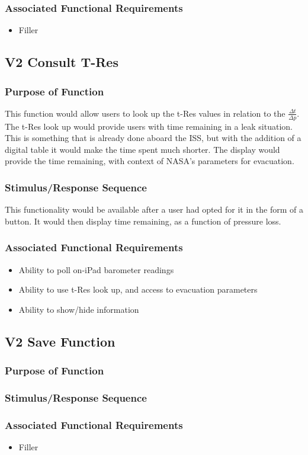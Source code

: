 \documentclass[onecolumn, draftclsnofoot,10pt, compsoc]{IEEEtran}
\begin{document}
\subsubsection{Associated Functional Requirements}
\begin{itemize}
\item Filler
\end{itemize}

\subsection{V2 Consult T-Res}
\subsubsection{Purpose of Function}
This function would allow users to look up the t-Res values in relation to the $\frac{\Delta t}{\Delta p}$.
The t-Res look up would provide users with time remaining in a leak situation.
This is something that is already done aboard the ISS, but with the addition of a digital table it would make the time spent much shorter.
The display would provide the time remaining, with context of NASA's parameters for evacuation.
\subsubsection{Stimulus/Response Sequence}
This functionality would be available after a user had opted for it in the form of a button.
It would then display time remaining, as a function of pressure loss.
\subsubsection{Associated Functional Requirements}
\begin{itemize}
\item Ability to poll on-iPad barometer readings
\item Ability to use t-Res look up, and access to evacuation parameters
\item Ability to show/hide information
\end{itemize}

\subsection{V2 Save Function}
\subsubsection{Purpose of Function}
\subsubsection{Stimulus/Response Sequence}
\subsubsection{Associated Functional Requirements}
\begin{itemize}
\item Filler
\end{itemize}
\end{document}
